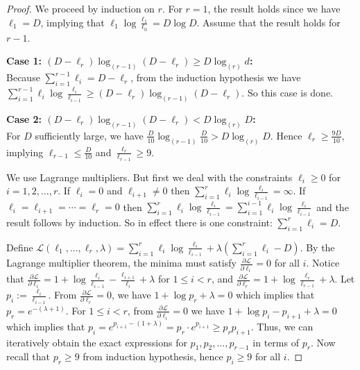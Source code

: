 \documentclass[12pt,a4paper]{article}
\def\cL{{\mathcal L}}
\theoremstyle{plain}
\begin{document}
\begin{proof}
	We proceed by induction on $r$. For $r=1$, the result holds since we have $\ell_1=D$, implying that $\ell_1\log\frac{\ell_1}{\ell_0} = D\log D$. Assume that the result holds for $r-1$.  

{\bf Case 1: $(D-\ell_r)\log_{(r-1)}(D-\ell_r) \geq D\log_{(r)} d$:}\\
Because $\sum\limits_{i=1}^{r-1} \ell_i = D-\ell_r$, from the induction hypothesis we have $\sum\limits_{i=1}^{r-1} \ell_i\log\frac{\ell_i}{\ell_{i-1}} \geq (D-\ell_r)\log_{(r-1)}(D-\ell_r)$. So this case is done.

{\bf Case 2: $(D-\ell_r)\log_{(r-1)}(D-\ell_r)< D\log_{(r)} D$:}\\
For $D$ sufficiently large, we have $\frac{D}{10}\log_{(r-1)} \frac{D}{10} > D\log_{(r)} D$. Hence $\ell_r \geq \frac{9D}{10}$, implying $\ell_{r-1} \leq \frac{D}{10}$ and $\frac{\ell_r}{\ell_{r-1}} \geq 9$.

We use Lagrange multipliers. But first we deal with the constraints $\ell_i\geq 0$ for $i=1,2,\ldots,r$. If $\ell_i=0$ and $\ell_{i+1}\neq 0$ then $\sum\limits_{i=1}^r \ell_i \log \frac{\ell_i}{\ell_{i-1}}=\infty$. If $\ell_i=\ell_{i+1}=\cdots=\ell_r=0$ then $\sum\limits_{i=1}^r \ell_i \log \frac{\ell_i}{\ell_{i-1}}=\sum\limits_{i=1}^{i-1} \ell_i \log \frac{\ell_i}{\ell_{i-1}}$ and the result follows by induction.  So in effect there is one constraint: $\sum\limits_{i=1}^r \ell_i = D$.

Define $\cL(\ell_1,...,\ell_r,\lambda) = \sum\limits_{i=1}^r \ell_i \log \frac{\ell_i}{\ell_{i-1}} + \lambda \left(\sum\limits_{i=1}^r \ell_i - D\right)$. By the Lagrange multiplier theorem, the minima must satisfy $\frac{\partial\cL}{\partial \ell_i} = 0$ for all $i$. Notice that $\frac{\partial \cL}{\partial \ell_i} = 1 + \log\frac{\ell_{i}}{\ell_{i-1}} - \frac{\ell_{i+1}}{\ell_i} + \lambda$ for $1 \leq i < r$, and $\frac{\partial\cL}{\partial\ell_r} = 1+\log \frac{\ell_r}{\ell_{r-1}} +\lambda$. Let $p_i := \frac{\ell_i}{\ell_{i-1}}$. From $\frac{\partial\cL}{\partial \ell_r}=0$, we have $1+\log p_r + \lambda = 0$ which implies that $p_r = e^{-(\lambda+1)}$. For $1\leq i<r$, from $\frac{\partial\cL}{\partial\ell_i}=0$ we have $1+\log p_i -p_{i+1}+\lambda = 0$ which  implies that $p_i = e^{p_{i+1}-(1+\lambda)} = p_r\cdot e^{p_{i+1}}\geq p_rp_{i+1}$. Thus, we can iteratively obtain the exact expressions for $p_1,p_2,...,p_{r-1}$ in terms of $p_r$. Now recall that $p_r\geq 9$ from induction hypothesis, hence $p_i \geq 9$ for all $i$. 
	

\end{proof}
\end{document}
